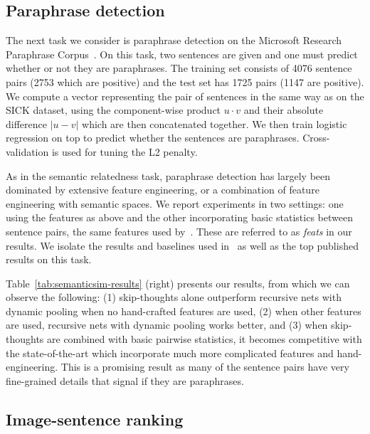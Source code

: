 \documentclass{article} \usepackage{nips15submit_e,times}
\begin{document}
\subsection{Paraphrase detection}

The next task we consider is paraphrase detection on the Microsoft Research Paraphrase Corpus~\cite{dolan2004unsupervised}. On this task, two sentences are given and one must predict whether or not they are paraphrases. The training set consists of 4076 sentence pairs (2753 which are positive) and the test set has 1725 pairs (1147 are positive). We compute a vector representing the pair of sentences in the same way as on the SICK dataset, using the component-wise product $u \cdot v$ and their absolute difference $|u - v|$ which are then concatenated together. We then train logistic regression on top to predict whether the sentences are paraphrases. Cross-validation is used for tuning the L2 penalty. 

As in the semantic relatedness task, paraphrase detection has largely been dominated by extensive feature engineering, or a combination of feature engineering with semantic spaces. We report experiments in two settings: one using the features as above and the other incorporating basic statistics between sentence pairs, the same features used by~\cite{socher2011dynamic}. These are referred to as {\it feats} in our results. We isolate the results and baselines used in~\cite{socher2011dynamic} as well as the top published results on this task.

Table~\ref{tab:semanticsim-results} (right) presents our results, from which we can observe the following: (1) skip-thoughts alone outperform recursive nets with dynamic pooling when no hand-crafted features are used, (2) when other features are used, recursive nets with dynamic pooling works better, and (3) when skip-thoughts are combined with basic pairwise statistics, it becomes competitive with the state-of-the-art which incorporate much more complicated features and hand-engineering. This is a promising result as many of the sentence pairs have very fine-grained details that signal if they are paraphrases. 


\subsection{Image-sentence ranking}
\label{sec:rank}
\end{document}
